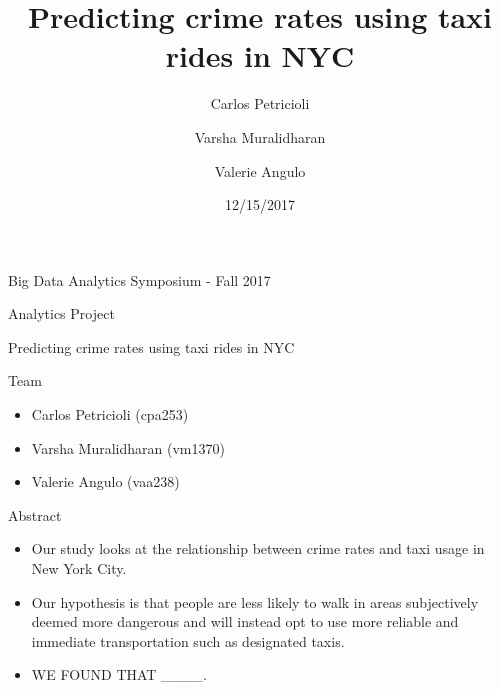 \documentclass[10pt,ignorenonframetext,]{beamer}
\author{Carlos Petricioli \and
    Varsha Muralidharan   \and
    Valerie Angulo  }
\institute[New York University]{ New York University \\ \{cpa253,vm1370,vaa238\}@nyu.edu }
\title{Predicting crime rates using taxi rides in NYC}
\date{12/15/2017}
\providecommand{\tightlist}{%
  \setlength{\itemsep}{0pt}\setlength{\parskip}{0pt}}
\begin{document}
\frame{\titlepage}

\begin{frame}{Big Data Analytics Symposium - Fall 2017}

\begin{block}{Analytics Project}

Predicting crime rates using taxi rides in NYC

\end{block}

\begin{block}{Team}

\begin{itemize}
\item
  Carlos Petricioli (cpa253)
\item
  Varsha Muralidharan (vm1370)
\item
  Valerie Angulo (vaa238)
\end{itemize}

\end{block}

\begin{block}{Abstract}

\begin{itemize}
\tightlist
\item
  Our study looks at the relationship between crime rates and taxi usage
  in New York City.
\item
  Our hypothesis is that people are less likely to walk in areas
  subjectively deemed more dangerous and will instead opt to use more
  reliable and immediate transportation such as designated taxis.
\item
  WE FOUND THAT \_\_\_\_.
\end{itemize}

\end{block}

\end{frame}
\end{document}
